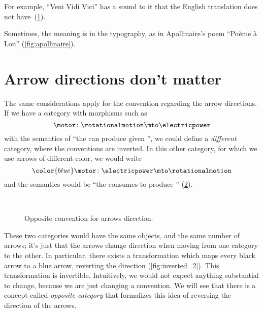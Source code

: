 For example, ``Veni Vidi Vici'' has a sound to it that the English translation does not have~(\cref{fig:vedividivici}).

\begin{figure}[h!]
    \centering
    \caption{}
    \label{fig:vedividivici}
\end{figure}

Sometimes, the meaning is in the typography, as in Apollinaire's poem ``Po\`eme \`a Lou'' (\cref{fig:apollinaire}).

\begin{figure*}[h!]
    \centering
    \caption{}
    \label{fig:apollinaire}
\end{figure*}

\section{Arrow directions don't matter}
The same considerations apply for the convention regarding the arrow directions.
If we have a category with morphisms such as
\begin{equation}
    \motor \colon \rotationalmotion \mto \electricpower
\end{equation}
with the semantics of ``the \motor can produce \rotationalmotion given \electricpower'', we could define a \emph{different} category, where the conventions are inverted.
In this other category, for which we use arrows of different color, we would write
\begin{equation}
    {\color{blue}\motor}
    \colon \electricpower  \mto  \rotationalmotion
\end{equation}
and the semantics would be ``the \motor consumes \electricpower to produce \rotationalmotion'' (\cref{fig:inverted}).

\begin{figure}[h!]
    \centering
    \\[+15pt]
    \caption{Opposite convention for arrows direction. }
    \label{fig:inverted}
\end{figure}

These two categories would have the same objects, and the same number of arrows; it's just that the arrows change direction when moving from one category to the other.
In particular, there exists a transformation which maps every black arrow to a blue arrow, reverting the direction (\cref{fig:inverted_2}).
This transformation is invertible.
Intuitively, we would not expect anything substantial to change, because we are just changing a convention.
We will see that there is a concept called \emph{opposite category} that formalizes this idea of reversing the direction of the arrows.


